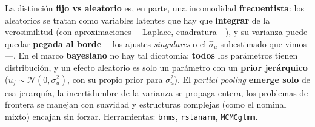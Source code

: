 \documentclass[
  letterpaper,
  DIV=11,
  numbers=noendperiod]{scrartcl}
\begin{document}
\begin{tcolorbox}[enhanced jigsaw, coltitle=black, rightrule=.15mm, arc=.35mm, leftrule=.75mm, colback=white, colbacktitle=quarto-callout-note-color!10!white, left=2mm, breakable, toptitle=1mm, toprule=.15mm, bottomtitle=1mm, titlerule=0mm, title=\textcolor{quarto-callout-note-color}{\faInfo}\hspace{0.5em}{Los efectos aleatorios encajan mejor en el enfoque bayesiano}, bottomrule=.15mm, opacityback=0, opacitybacktitle=0.6, colframe=quarto-callout-note-color-frame]

La distinción \textbf{fijo vs aleatorio} es, en parte, una incomodidad
\textbf{frecuentista}: los aleatorios se tratan como variables latentes
que hay que \textbf{integrar} de la verosimilitud (con aproximaciones
---Laplace, cuadratura---), y su varianza puede quedar \textbf{pegada al
borde} ---los ajustes \emph{singulares} o el \(\hat\sigma_u\)
subestimado que vimos---. En el marco \textbf{bayesiano} no hay tal
dicotomía: \textbf{todos} los parámetros tienen distribución, y un
efecto aleatorio es solo un parámetro con un \textbf{prior jerárquico}
(\(u_j\sim\mathcal{N}(0,\sigma_u^2)\), con su propio prior para
\(\sigma_u^2\)). El \emph{partial pooling} \textbf{emerge solo} de esa
jerarquía, la incertidumbre de la varianza se propaga entera, los
problemas de frontera se manejan con suavidad y estructuras complejas
(como el nominal mixto) encajan sin forzar. Herramientas: \texttt{brms},
\texttt{rstanarm}, \texttt{MCMCglmm}.

\end{tcolorbox}
\end{document}
